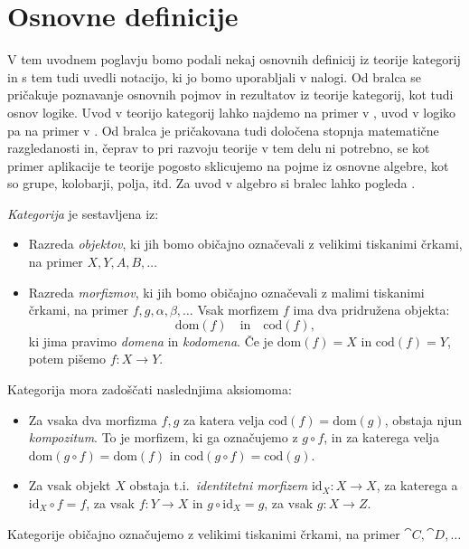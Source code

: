 \documentclass[../kategoricna_logika.tex]{subfiles}
\begin{document}
\section{
  Osnovne definicije}
%
V tem uvodnem poglavju bomo podali nekaj osnovnih definicij iz
teorije kategorij in s tem tudi uvedli notacijo,
ki jo bomo uporabljali v nalogi.
Od bralca se pričakuje poznavanje osnovnih pojmov in rezultatov iz
teorije kategorij, kot tudi osnov logike.
Uvod v teorijo kategorij lahko najdemo na primer v
\cite{taslak2017,riehl2017category,awodey2010category},
uvod v logiko pa na primer v \cite{prijatelj1992osnove1}.
Od bralca je pričakovana tudi določena stopnja matematične razgledanosti
in, čeprav to pri razvoju teorije v tem delu ni potrebno, se kot
primer aplikacije te teorije pogosto sklicujemo na pojme iz
osnovne algebre, kot so grupe, kolobarji, polja, itd.
Za uvod v algebro si bralec lahko pogleda \cite{bresar2018uvod}.
\begin{definicija}
  \emph{Kategorija} je sestavljena iz:
  \begin{itemize}
  \item Razreda \emph{objektov}, ki jih bomo običajno označevali z
    velikimi tiskanimi črkami, na primer $X, Y, A, B, \ldots$
  \item Razreda \emph{morfizmov}, ki jih bomo običajno označevali z
    malimi tiskanimi črkami, na primer $f,g,\alpha,\beta, \ldots$
    Vsak morfizem $f$ ima dva pridružena objekta:
    \[ \mathrm{dom}(f) \quad \text{in} \quad \mathrm{cod}(f), \]
    ki jima pravimo \emph{domena} in \emph{kodomena}. Če je $\mathrm{dom}(f)=X$
    in ${\mathrm{cod}(f)=Y}$, potem pišemo $f : X \to Y$.
  \end{itemize}
  Kategorija mora zadoščati naslednjima aksiomoma:
  \begin{itemize}
  \item   Za vsaka dva morfizma $f,g$ za katera velja $\mathrm{cod}(f) = \mathrm{dom}(g)$,
  obstaja njun \emph{kompozitum}. To je morfizem, ki ga označujemo z $g \circ f$, in
  za katerega velja $\mathrm{dom}(g \circ f) = \mathrm{dom}(f)$ in
  $\mathrm{cod}(g \circ f) = \mathrm{cod}(g)$.
  \item Za vsak objekt $X$ obstaja t.i.\ \emph{identitetni morfizem}
  $\mathrm{id}_X : X \to X$, za katerega a $\mathrm{id}_X \circ f = f$,
  za vsak $f : Y \to X$ in $g \circ \mathrm{id}_X = g$, za vsak $g : X \to Z$.
\end{itemize}
Kategorije običajno označujemo z velikimi tiskanimi črkami, na primer $\cat{C}, \cat{D}, \ldots$
\end{definicija}
\end{document}
